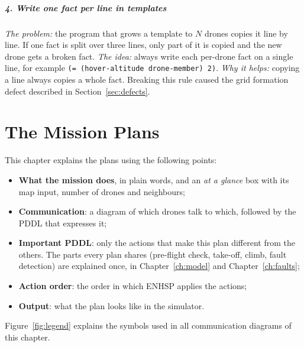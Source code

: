 \documentclass[11pt,a4paper,oneside]{report}
\newcommand{\code}[1]{\texttt{#1}}
\begin{document}
\paragraph{4. Write one fact per line in templates}
\emph{The problem:} the program that grows a template to $N$ drones copies it line by line. If
one fact is split over three lines, only part of it is copied and the new drone gets a broken
fact. \emph{The idea:} always write each per-drone fact on a single line, for example
\code{(= (hover-altitude drone-member) 2)}. \emph{Why it helps:} copying a line always copies a
whole fact. Breaking this rule caused the grid formation defect described in
Section~\ref{sec:defects}.

\chapter{The Mission Plans}\label{ch:plans}
This chapter explains the plans using the following points:
\begin{itemize}
  \item \textbf{What the mission does}, in plain words, and an \emph{at a glance} box with its
        map input, number of drones and neighbours;
  \item \textbf{Communication}: a diagram of which drones talk to which, followed by the PDDL that
        expresses it;
  \item \textbf{Important PDDL}: only the actions that make this plan different from the others.
        The parts every plan shares (pre-flight check, take-off, climb, fault detection) are
        explained once, in Chapter~\ref{ch:model} and Chapter~\ref{ch:faults};
  \item \textbf{Action order}: the order in which ENHSP applies the actions;
  \item \textbf{Output}: what the plan looks like in the simulator.
\end{itemize}
Figure~\ref{fig:legend} explains the symbols used in all communication diagrams of this chapter.
\end{document}
